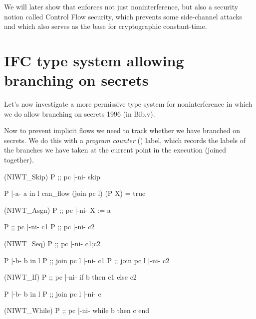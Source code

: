 \documentclass[12pt]{report}
\begin{document}
We will later show that  enforces not just
    noninterference, but also a security notion called Control Flow
    security, which prevents some side-channel attacks and which also
    serves as the base for cryptographic constant-time. 
\begin{coqdoccode}
\coqdocemptyline
\end{coqdoccode}
\section{IFC type system allowing branching on secrets}



 Let's now investigate a more permissive type system for
    noninterference in which we do allow branching on secrets
       1996 (in Bib.v).


    Now to prevent implicit flows we need to track whether we have
    branched on secrets. We do this with a \textit{program counter} ()
    label, which records the labels of the branches we have taken at
    the current point in the execution (joined together). 

\par
\noindent\hrulefill\par
\noindent{}                      (NIWT\_Skip)
                      P ;; pc |-ni- skip


       P |-a- a in l   can\_flow (join pc l) (P X) = true
\par
\noindent\hrulefill\par
\noindent{}   (NIWT\_Asgn)
                     P ;; pc |-ni- X := a


                P ;; pc |-ni- c1    P ;; pc |-ni- c2
\par
\noindent\hrulefill\par
\noindent{}             (NIWT\_Seq)
                      P ;; pc |-ni- c1;c2


           P |-b- b in l    P ;; join pc l |-ni- c1
                             P ;; join pc l |-ni- c2
\par
\noindent\hrulefill\par
\noindent{}            (NIWT\_If)
                P ;; pc |-ni- if b then c1 else c2


              P |-b- b in l    P ;; join pc l |-ni- c
\par
\noindent\hrulefill\par
\noindent{}       (NIWT\_While)
                P ;; pc |-ni- while b then c end
\end{document}
